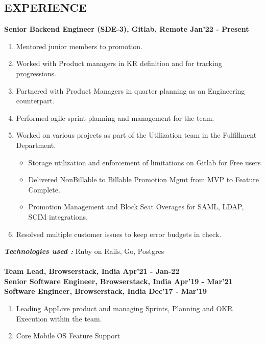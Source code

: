 \documentclass[line, margin]{res}
\begin{document}
\address{ +91 9833471993, surajtripathi793@gmail.com}
\begin{resume}

\section{EXPERIENCE} 
\textbf{Senior Backend Engineer (SDE-3), Gitlab, Remote \hfill Jan'22 - Present} \\
\begin{enumerate}
  \item Mentored junior members to promotion.
  \item Worked with Product managers in KR definition and for tracking progressions.
  \item Partnered with Product Managers in quarter planning as an Engineering counterpart.
  \item Performed agile sprint planning and management for the team.
  \item Worked on various projects as part of the Utilization team in the Fulfillment Department.
  \begin{itemize}
    \item Storage utilization and enforcement of limitations on Gitlab for Free users
    \item Delivered NonBillable to Billable Promotion Mgmt from MVP to Feature Complete.
    \item Promotion Management and Block Seat Overages for SAML, LDAP, SCIM integrations.
  \end{itemize}
  \item Resolved multiple customer issues to keep error budgets in check.
\end{enumerate}
\textbf{\textit{Technologies used : }} Ruby on Rails, Go, Postgres\\
\\
\textbf{Team Lead, Browserstack, India \hfill Apr'21 - Jan-22} \\
\textbf{Senior Software Engineer, Browserstack, India \hfill Apr'19 - Mar'21} \\
\textbf{Software Engineer, Browserstack, India \hfill Dec'17 - Mar'19} \\
\begin{enumerate}
   \item Leading AppLive product and managing Sprints, Planning and OKR Execution within the team.
   \item Core Mobile OS Feature Support
   \begin{itemize}

\end{itemize}
\end{enumerate}
\end{resume}
\end{document}
